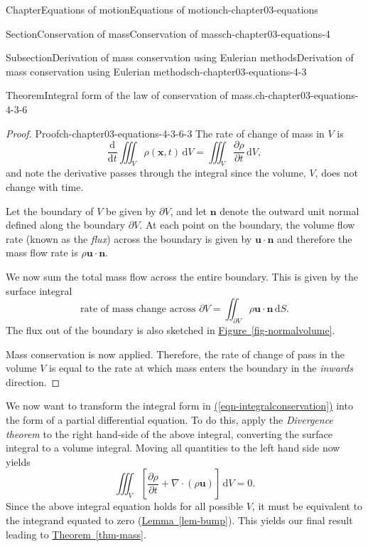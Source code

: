 \documentclass[oneside,10pt,]{book}
\newcommand{\xreffont}{\relax}
\numberwithin{equation}{section}
\newcommand{\de}{\mathrm{d}}
\newcommand{\dd}[2]{\frac{\de#1}{\de#2}}
\newcommand{\pd}[2]{\frac{\partial#1}{\partial#2}}
\newcommand{\bx}{\boldsymbol{x}}
\newcommand{\bn}{\boldsymbol{n}}
\newcommand{\bu}{\boldsymbol{u}}
\begin{document}
\begin{chapterptx}{Chapter}{Equations of motion}{}{Equations of motion}{}{}{ch-chapter03-equations}
\begin{sectionptx}{Section}{Conservation of mass}{}{Conservation of mass}{}{}{ch-chapter03-equations-4}
\begin{subsectionptx}{Subsection}{Derivation of mass conservation using Eulerian methods}{}{Derivation of mass conservation using Eulerian methods}{}{}{ch-chapter03-equations-4-3}
\begin{theorem}{Theorem}{Integral form of the law of conservation of mass.}{}{ch-chapter03-equations-4-3-6}
%
\end{theorem}
\begin{proof}{Proof}{}{ch-chapter03-equations-4-3-6-3}
The rate of change of mass in \(V\) is%
\begin{equation*}
\dd{}{t} \iiint_V \rho(\bx, t) \, \de V = \iiint_V \pd{\rho}{t} \, \de V,
\end{equation*}
and note the derivative passes through the integral since the volume, \(V\), does not change with time.%
\par
Let the boundary of \(V\) be given by \(\partial V\), and let \(\bn\) denote the outward unit normal defined along the boundary \(\partial V\). At each point on the boundary, the volume flow rate (known as the \emph{flux}) across the boundary is given by \(\bu
\cdot \bn\) and therefore the mass flow rate is \(\rho \bu \cdot \bn\).%
\par
We now sum the total mass flow across the entire boundary. This is given by the surface integral%
\begin{equation*}
\text{rate of mass change across $\partial V$} = \iint_{\partial V} \rho \bu \cdot \bn \,
\de{S}.
\end{equation*}
The flux out of the boundary is also sketched in \hyperref[fig-normalvolume]{Figure~{\xreffont\ref{fig-normalvolume}}}.%
\par
Mass conservation is now applied. Therefore, the rate of change of pass in the volume \(V\) is equal to the rate at which mass enters the boundary in the \emph{inwards} direction.%
\end{proof}
We now want to transform the integral form in \hyperref[eqn-integralconservation]{({\xreffont\ref{eqn-integralconservation}})} into the form of a partial differential equation. To do this, apply the \emph{Divergence theorem} to the right hand-side of the above integral, converting the surface integral to a volume integral. Moving all quantities to the left hand side now yields%
\begin{equation*}
\iiint_V \left[ \pd{\rho}{t} + \nabla \cdot (\rho \bu)\right] \, \de{V} = 0.
\end{equation*}
Since the above integral equation holds for all possible \(V\), it must be equivalent to the integrand equated to zero (\hyperref[lem-bump]{Lemma~{\xreffont\ref{lem-bump}}}). This yields our final result leading to \hyperref[thm-mass]{Theorem~{\xreffont\ref{thm-mass}}}.%
\end{subsectionptx}
%
%
\typeout{************************************************}

\end{sectionptx}
\end{chapterptx}
\end{document}
